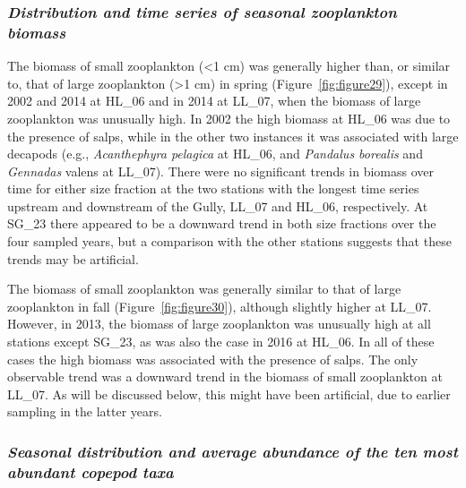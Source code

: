 \documentclass[12pt]{article}\usepackage[]{graphicx}\usepackage[]{color}
\begin{document}
\hypertarget{distribution-and-time-series-of-seasonal-zooplankton-biomass}{%
\subsubsection{\texorpdfstring{\emph{Distribution and time series of seasonal zooplankton biomass}}{Distribution and time series of seasonal zooplankton biomass}}\label{distribution-and-time-series-of-seasonal-zooplankton-biomass}}

The biomass of small zooplankton (\textless1 cm) was generally higher than, or similar to, that of large zooplankton (\textgreater1 cm) in spring (Figure~\ref{fig:figure29}), except in 2002 and 2014 at HL\_06 and in 2014 at LL\_07, when the biomass of large zooplankton was unusually high. In 2002 the high biomass at HL\_06 was due to the presence of salps, while in the other two instances it was associated with large decapods (e.g., \emph{Acanthephyra pelagica} at HL\_06, and \emph{Pandalus borealis} and \emph{Gennadas} valens at LL\_07). There were no significant trends in biomass over time for either size fraction at the two stations with the longest time series upstream and downstream of the Gully, LL\_07 and HL\_06, respectively. At SG\_23 there appeared to be a downward trend in both size fractions over the four sampled years, but a comparison with the other stations suggests that these trends may be artificial.

The biomass of small zooplankton was generally similar to that of large zooplankton in fall (Figure~\ref{fig:figure30}), although slightly higher at LL\_07. However, in 2013, the biomass of large zooplankton was unusually high at all stations except SG\_23, as was also the case in 2016 at HL\_06. In all of these cases the high biomass was associated with the presence of salps. The only observable trend was a downward trend in the biomass of small zooplankton at LL\_07. As will be discussed below, this might have been artificial, due to earlier sampling in the latter years.

\hypertarget{seasonal-distribution-and-average-abundance-of-the-ten-most-abundant-copepod-taxa}{%
\subsubsection{\texorpdfstring{\emph{Seasonal distribution and average abundance of the ten most abundant copepod taxa}}{Seasonal distribution and average abundance of the ten most abundant copepod taxa}}\label{seasonal-distribution-and-average-abundance-of-the-ten-most-abundant-copepod-taxa}}
\end{document}
